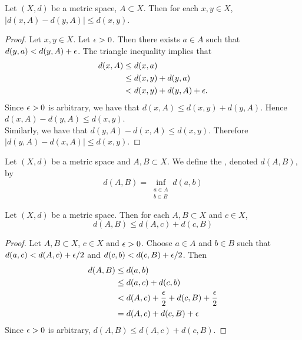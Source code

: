 \documentclass{book}
\begin{document}
\begin{ex} 
	Let $(X, d)$ be a metric space, $A \subset X$. Then for each $x,y \in X$, $|d(x, A) - d(y, A)| \leq d(x, y)$.
\end{ex}

\begin{proof}
	Let $x,y \in X$. Let $\epsilon > 0$. Then there exists $a \in A$ such that $d(y, a) < d(y, A) + \epsilon$. The triangle inequality implies that
	\begin{align*}
		d(x, A) 
		& \leq d(x, a) \\
		& \leq d(x, y) + d(y, a) \\
		& < d(x, y) + d(y, A) + \epsilon. 
	\end{align*}
	Since $\epsilon > 0$ is arbitrary, we have that $d(x, A) \leq d(x, y) + d(y, A)$. Hence $d(x, A) - d(y, A) \leq d(x, y)$. \\
	Similarly, we have that $d(y, A) - d(x, A) \leq d(x, y)$. Therefore $|d(y, A) - d(x, A)| \leq d(x,y)$. 
\end{proof}

\begin{defn} 
	Let $(X,d)$ be a metric space and $A,B \subset X$. We define the , denoted $d(A,B)$, by $$d(A,B) = \inf_{\substack{a \in A \\ b \in B}} d(a,b)$$
\end{defn}

\begin{ex} 
	Let $(X,d)$ be a metric space. Then for each $A,B \subset X$ and $c \in X$, $$d(A,B) \leq d(A,c) + d(c, B)$$
\end{ex}

\begin{proof}
	Let $A,B \subset X$, $c \in X$ and $\epsilon>0$. Choose $a \in A$ and $b \in B$ such that $d(a,c) < d(A,c)+ \epsilon/2$ and  $d(c,b) < d(c,B)+ \epsilon/2$. Then 
	\begin{align*}
		d(A,B) 
		&\leq d(a,b) \\
		&\leq d(a,c) + d(c,b) \\
		&< d(A,c) + \frac{\epsilon}{2} + d(c,B) + \frac{\epsilon}{2} \\
		&= d(A,c) + d(c,B) + \epsilon
	\end{align*}
	Since $\epsilon >0$ is arbitrary, $d(A,B) \leq d(A,c) + d(c,B)$.
\end{proof}
\end{document}
